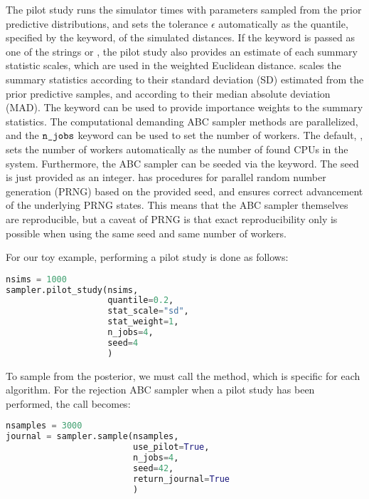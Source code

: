 The pilot study runs the simulator  times with parameters sampled from the prior predictive distributions, and sets the tolerance $\epsilon$ automatically as the quantile, specified by the  keyword, of the simulated distances. If the  keyword is passed as one of the strings  or , the pilot study also provides an estimate of each summary statistic scales, which are used in the weighted Euclidean distance.  scales the summary statistics according to their standard deviation (SD) estimated from the prior predictive samples, and  according to their median absolute deviation (MAD). The  keyword can be used to provide importance weights to the summary statistics. The computational demanding ABC sampler methods are parallelized, and the $\cw{n_jobs}$ keyword can be used to set the number of workers. The default, , sets the number of workers automatically as the number of found CPUs in the system. Furthermore, the ABC sampler can be seeded via the  keyword. The seed is just provided as an integer.  has procedures for parallel random number generation (PRNG) based on the provided seed, and ensures correct advancement of the underlying PRNG states. This means that the ABC sampler themselves are reproducible, but a caveat of PRNG is that exact reproducibility only is possible when using the same seed and same number of workers. 

For our toy example, performing a pilot study is done as follows: 

\begin{lstlisting}[language=python]
nsims = 1000
sampler.pilot_study(nsims,
                    quantile=0.2,
                    stat_scale="sd",
                    stat_weight=1,
                    n_jobs=4,
                    seed=4
                    )
\end{lstlisting}

To sample from the posterior, we must call the  method, which is specific for each algorithm. For the rejection ABC sampler when a pilot study has been performed, the call becomes: 

\begin{lstlisting}[language=python]
nsamples = 3000
journal = sampler.sample(nsamples,
                         use_pilot=True,
                         n_jobs=4,
                         seed=42,
                         return_journal=True
                         )
\end{lstlisting}

